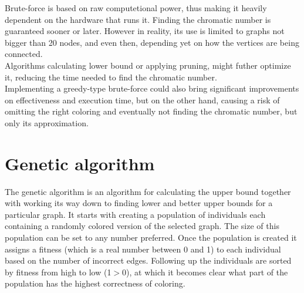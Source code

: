 \documentclass[a4paper]{report}
\begin{document}
		Brute-force is based on raw computetional power, thus making it heavily dependent on the hardware that runs it. Finding the chromatic number is guaranteed sooner or later. However in reality, its use is limited to graphs not bigger than 20 nodes, and even then, depending yet on how the vertices are being connected.\\
		
		Algorithms calculating lower bound or applying pruning, might futher optimize it, reducing the time needed to find the chromatic number. \\
		
		Implementing a greedy-type brute-force could also bring significant improvements on effectiveness and execution time, but on the other hand, causing a risk of omitting the right coloring and eventually not finding the chromatic number, but only its approximation.	
			
		\section{Genetic algorithm}
		The genetic algorithm is an algorithm for calculating the upper bound together with working its way down to finding lower and better upper bounds for a particular graph. It starts with creating a population of individuals each containing a randomly colored version of the selected graph. The size of this population can be set to any number preferred. Once the population is created it assigns a fitness (which is a real number between 0 and 1) to each individual based on the number of incorrect edges. Following up the individuals are sorted by fitness from high to low (1$>$0), at which it becomes clear what part of the population has the highest correctness of coloring.\\
		
\end{document}
